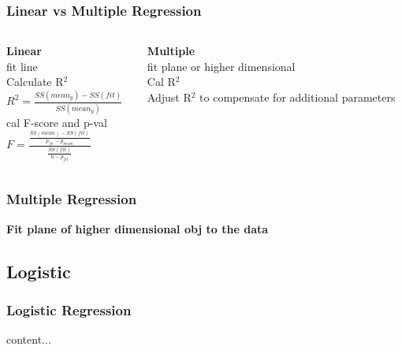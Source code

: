 \documentclass{beamer}
\begin{document}
\begin{frame}\frametitle{Linear vs Multiple Regression}
	\begin{columns}
		\begin{column}{0.5\textwidth}
			\textbf{Linear}\\
			fit line\\
			Calculate R$^2$\\
			$R^2 = \frac{SS(mean_y)-SS(fit)}{SS(mean_y)}$\\
			cal F-score and p-val\\
			$F = \frac{\frac{SS(mean)-SS(fit)}{p_{fit}-p_{mean}}}{\frac{SS(fit)}{n-p_{fit}}}$
		\end{column}
		\begin{column}{0.5\textwidth}
			\textbf{Multiple}\\
			fit plane or higher dimensional\\
			Cal R$^2$\\
			Adjust R$^2$ to compensate for additional parameters\\
		\end{column}
	\end{columns}
\end{frame}

\begin{frame}\frametitle{Multiple Regression}
	\textbf{Fit plane of higher dimensional obj to the data}\\
	
\end{frame}

\subsection{Logistic}
\begin{frame}\frametitle{Logistic Regression}
content...
\end{frame}



\end{document}
